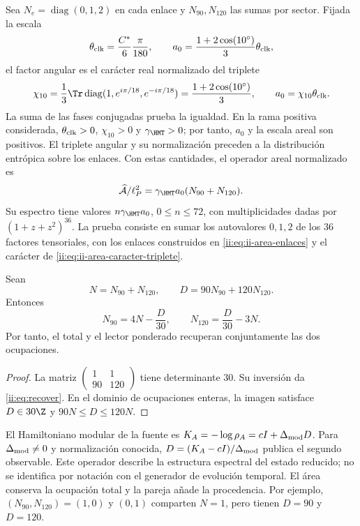 Sea $N_e=\operatorname{diag}(0,1,2)$ en cada enlace y
$N_{90},N_{120}$ las sumas por sector. Fijada la escala
\[
\theta_{\rm clk}=\frac{C^*}{6}\frac{\pi}{180},\qquad
a_0=\frac{1+2\cos(10^\circ)}3\theta_{\rm clk},
\]
el factor angular es el carácter real normalizado del triplete
\begin{equation}
 \chi_{10}=\frac13\Tr\operatorname{diag}
       (1,e^{i\pi/18},e^{-i\pi/18})
 =\frac{1+2\cos(10^\circ)}3,
 \qquad a_0=\chi_{10}\theta_{\rm clk}.
 \label{ii:eq:ii-area-caracter-triplete}
\end{equation}
La suma de las fases conjugadas prueba la igualdad. En la rama positiva
considerada, \(\theta_{\rm clk}>0\), \(\chi_{10}>0\) y
\(\gamma_{\HMT}>0\); por tanto, \(a_0\) y la escala areal son
positivos. El triplete angular y su normalización preceden a la
distribución entrópica sobre los enlaces. Con estas cantidades,
el operador areal normalizado es
\[
\widehat{\mathcal A}/\ell_P^2
=\gamma_{\HMT}a_0(N_{90}+N_{120}).
\]
Su espectro tiene valores $n\gamma_{\HMT}a_0$, $0\le n\le72$,
con multiplicidades dadas por $(1+z+z^2)^{36}$.
La prueba consiste en sumar los autovalores $0,1,2$ de los
36 factores tensoriales, con los enlaces construidos en \eqref{ii:eq:ii-area-enlaces} y el carácter de \eqref{ii:eq:ii-area-caracter-triplete}.

\begin{theorem}
Sean
\[
N=N_{90}+N_{120},\qquad D=90N_{90}+120N_{120}.
\]
Entonces
\begin{equation}
N_{90}=4N-\frac D{30},\qquad
N_{120}=\frac D{30}-3N.
\label{ii:eq:recover}
\end{equation}
Por tanto, el total y el lector ponderado recuperan conjuntamente
las dos ocupaciones.
\end{theorem}
\begin{proof}
La matriz $\left(\begin{smallmatrix}1&1\\90&120\end{smallmatrix}\right)$
tiene determinante $30$. Su inversión da \eqref{ii:eq:recover}.
En el dominio de ocupaciones enteras, la imagen satisface
$D\in30\Z$ y $90N\le D\le120N$.
\end{proof}

El Hamiltoniano modular de la fuente es
$K_A=-\log\rho_A=cI+\Delta_{\rm mod}D$.
Para $\Delta_{\rm mod}\ne0$ y normalización conocida,
$D=(K_A-cI)/\Delta_{\rm mod}$ publica el segundo observable.
Este operador describe la estructura espectral del estado reducido;
no se identifica por notación con el generador de evolución temporal.
El área conserva la ocupación total y la pareja añade la procedencia.
Por ejemplo, $(N_{90},N_{120})=(1,0)$ y $(0,1)$ comparten $N=1$,
pero tienen $D=90$ y $D=120$.


